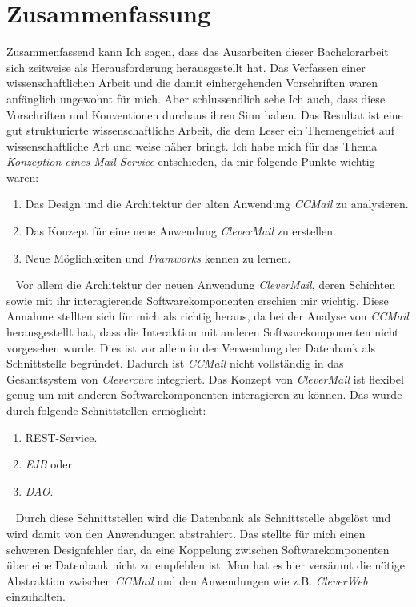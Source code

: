 
\chapter{Zusammenfassung}
Zusammenfassend kann Ich sagen, dass das Ausarbeiten dieser Bachelorarbeit sich zeitweise als Herausforderung herausgestellt hat. Das Verfassen einer wissenschaftlichen Arbeit und die damit einhergehenden Vorschriften waren anfänglich ungewohnt für mich. Aber schlussendlich sehe Ich auch, dass diese Vorschriften und Konventionen durchaus ihren Sinn haben. Das Resultat ist eine gut strukturierte wissenschaftliche Arbeit, die dem Leser ein Themengebiet auf wissenschaftliche Art und weise näher bringt.
\newline
\newline
Ich habe mich für das Thema \emph{Konzeption eines Mail-Service} entschieden, da mir folgende Punkte wichtig waren:
\begin{enumerate}
	\item Das Design und die Architektur der alten Anwendung \emph{CCMail} zu analysieren.
	\item Das Konzept für eine neue Anwendung \emph{CleverMail} zu erstellen.
	\item Neue Möglichkeiten und \emph{Framworks} kennen zu lernen.
\end{enumerate}
\ \newline
Vor allem die Architektur der neuen Anwendung \emph{CleverMail}, deren Schichten sowie mit ihr interagierende Softwarekomponenten erschien mir wichtig. Diese Annahme stellten sich für mich als richtig heraus, da bei der Analyse von \emph{CCMail} herausgestellt hat, dass die Interaktion mit anderen Softwarekomponenten nicht vorgesehen wurde. Dies ist vor allem in der Verwendung der Datenbank als Schnittstelle begründet. Dadurch ist \emph{CCMail} nicht vollständig in das Gesamtsystem von \emph{Clevercure} integriert.
\newline
\newline
Das Konzept von \emph{CleverMail} ist flexibel genug um mit anderen Softwarekomponenten interagieren zu können. Das wurde durch folgende Schnittstellen ermöglicht:
\begin{enumerate}
	\item REST-Service.
	\item \emph{EJB} oder 
	\item \emph{DAO}.
\end{enumerate}
\ \newline
Durch diese Schnittstellen wird die Datenbank als Schnittstelle abgelöst und wird damit von den Anwendungen abstrahiert. Das stellte für mich einen schweren Designfehler dar, da eine Koppelung zwischen Softwarekomponenten über eine Datenbank nicht zu empfehlen ist. Man hat es hier versäumt die nötige Abstraktion zwischen \emph{CCMail} und den Anwendungen wie z.B. \emph{CleverWeb} einzuhalten.
